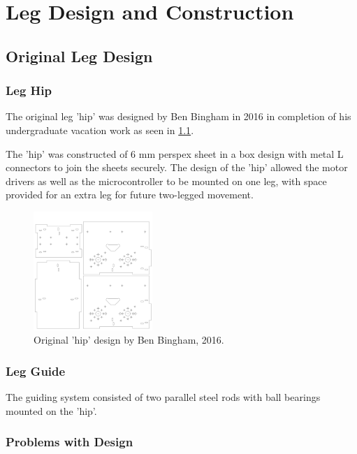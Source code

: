 \chapter{Leg Design and Construction}

\section{Original Leg Design}

\subsection{Leg Hip}
The original leg 'hip' was designed by Ben Bingham in 2016 in completion of his undergraduate vacation work as seen in \cref{fig:original-hip}.

The 'hip' was constructed of 6 mm perspex sheet in a box design with metal L connectors to join the sheets securely. The design of the 'hip' allowed the motor drivers as well as the microcontroller to be mounted on one leg, with space provided for an extra leg for future two-legged movement. 

\begin{figure}
\centering
\includegraphics[clip, trim =0cm 0cm 0cm 0cm, page =1, width=0.4\textwidth]{images/mechanical/hip-6mm-360x360}
\caption{Original 'hip' design by Ben Bingham, 2016.}
\label{fig:original-hip}
\end{figure}

\subsection{Leg Guide}
The guiding system consisted of two parallel steel rods with ball bearings mounted on the 'hip'. 

\subsection{Problems with Design}

